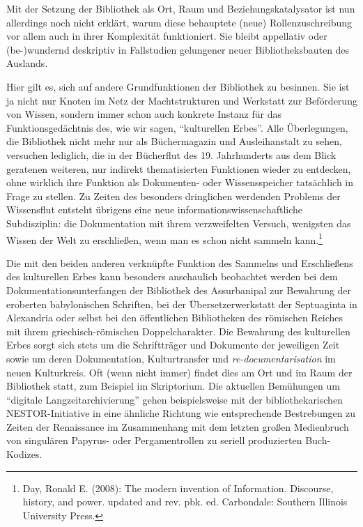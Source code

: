 Mit der Setzung der Bibliothek als Ort, Raum und Beziehungskatalysator
ist nun allerdings noch nicht erklärt, warum diese behauptete (neue)
Rollenzuschreibung vor allem auch in ihrer Komplexität funktioniert. Sie
bleibt appellativ oder (be-)wundernd deskriptiv in Fallstudien
gelungener neuer Bibliotheksbauten des Auslands.

Hier gilt es, sich auf andere Grundfunktionen der Bibliothek zu
besinnen. Sie ist ja nicht nur Knoten im Netz der Machtstrukturen und
Werkstatt zur Beförderung von Wissen, sondern immer schon auch konkrete
Instanz für das Funktionsgedächtnis des, wie wir sagen,
\enquote{kulturellen Erbes}. Alle Überlegungen, die Bibliothek nicht
mehr nur als Büchermagazin und Ausleihanstalt zu sehen, versuchen
lediglich, die in der Bücherflut des 19. Jahrhunderts aus dem Blick
geratenen weiteren, nur indirekt thematisierten Funktionen wieder zu
entdecken, ohne wirklich ihre Funktion als Dokumenten- oder
Wissensspeicher tatsächlich in Frage zu stellen. Zu Zeiten des besonders
dringlichen werdenden Problems der Wissensflut entsteht übrigens eine
neue informationswissenschaftliche Subdisziplin: die Dokumentation mit
ihrem verzweifelten Versuch, wenigsten das Wissen der Welt zu
erschließen, wenn man es schon nicht sammeln kann.\footnote{Day, Ronald
  E. (2008): The modern invention of Information. Discourse, history,
  and power. updated and rev. pbk. ed. Carbondale: Southern Illinois
  University Press.}

Die mit den beiden anderen verknüpfte Funktion des Sammelns und
Erschließens des kulturellen Erbes kann besonders anschaulich beobachtet
werden bei dem Dokumentationsunterfangen der Bibliothek des Assurbanipal
zur Bewahrung der eroberten babylonischen Schriften, bei der
Übersetzerwerkstatt der Septuaginta in Alexandria oder selbst bei den
öffentlichen Bibliotheken des römischen Reiches mit ihrem
griechisch-römischen Doppelcharakter. Die Bewahrung des kulturellen
Erbes sorgt sich stets um die Schriftträger und Dokumente der jeweiligen
Zeit sowie um deren Dokumentation, Kulturtransfer und
\emph{re-documentarisation} im neuen Kulturkreis. Oft (wenn nicht immer)
findet dies am Ort und im Raum der Bibliothek statt, zum Beispiel im
Skriptorium. Die aktuellen Bemühungen um \enquote{digitale
Langzeitarchivierung} gehen beispielsweise mit der bibliothekarischen
NESTOR-Initiative in eine ähnliche Richtung wie entsprechende
Bestrebungen zu Zeiten der Renaissance im Zusammenhang mit dem letzten
großen Medienbruch von singulären Papyrus- oder Pergamentrollen zu
seriell produzierten Buch-Kodizes.

